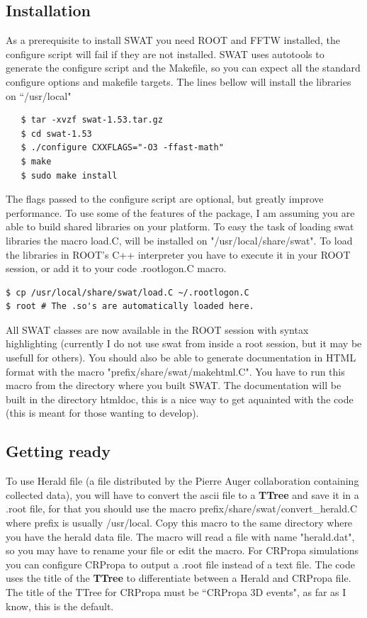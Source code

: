 \documentclass[12pt]{article}
\begin{document}
\subsection{Installation} \label{ch::installation}
As a prerequisite to install SWAT you need ROOT and FFTW installed, the
configure script will fail if they are not installed. SWAT uses autotools to
generate the configure script and the Makefile, so you can expect all the
standard configure options and makefile targets. The lines bellow will install
the libraries on {\color{textcolor}``/usr/local"}
{\bf \color{textcolor}
   \begin{lstlisting}
   $ tar -xvzf swat-1.53.tar.gz
   $ cd swat-1.53
   $ ./configure CXXFLAGS="-O3 -ffast-math"
   $ make
   $ sudo make install
   \end{lstlisting}
}
The flags passed to the configure script are optional, but greatly improve
performance.  To use some of the features of the package, I am assuming you are
able to build shared libraries on your platform. To easy the task of loading
swat libraries the macro load.C, will be installed on
{\color{textcolor}"/usr/local/share/swat"}. To load the libraries in ROOT's C++
interpreter you have to execute it in your ROOT session, or add it to
your code {\color{textcolor}.rootlogon.C} macro.

{\bf \color{textcolor}
\begin{lstlisting}
$ cp /usr/local/share/swat/load.C ~/.rootlogon.C
$ root # The .so's are automatically loaded here.
\end{lstlisting}
}

All SWAT classes are now available in the ROOT session with syntax highlighting
(currently I do not use swat from inside a root session, but it may be usefull
for others). You should also be able to generate documentation in HTML format
with the macro {\color{textcolor}"prefix/share/swat/makehtml.C"}. You have to run
this macro from the directory where you built SWAT. The documentation will be
built in the directory {\color{textcolor}htmldoc}, this is a nice way to get aquainted with 
the code (this is meant for those wanting to develop).

\subsection{Getting ready} \label{ch::ready}

To use Herald file (a file distributed by the Pierre Auger collaboration containing collected data),
you will have to convert the ascii file to a {\bf TTree} and
save it in a .root file, for that you should use the macro
{\color{textcolor}prefix/share/swat/convert\_herald.C} where prefix is usually
{\color{textcolor}/usr/local}.  Copy this macro to the same directory where you have the
herald data file. The macro will read a file with name
{\color{textcolor}"herald.dat"}, so you may have to rename your file or edit the macro. 
For CRPropa simulations you can configure CRPropa to output a .root file
instead of a text file.  The code uses the title of the {\bf TTree} to differentiate
between a Herald and CRPropa file. The title of the TTree for CRPropa must be
``{\color{textcolor}CRPropa 3D events}", as far as I know, this is the default.
\end{document}
